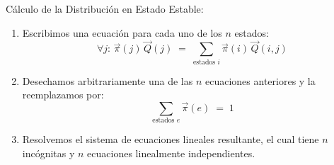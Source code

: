 \documentclass[ 10pt, xcolor = dvipsnames]{beamer}
\begin{document}
\begin{frame}[allowframebreaks]
\frametitle{\insertsubsection}

C\'alculo de la Distribuci\'on en Estado Estable: 
\begin{enumerate}
\item Escribimos una ecuaci\'on para cada uno de los $n$ estados: 
\[
\forall j \colon \, \vec{\pi}(j) \, \vec{Q}(j) \; = \; 
\sum_{\text{estados }i} \vec{\pi}(i) \, \vec{Q}(i,j) 
\]
\item Desechamos arbitrariamente una de las $n$ ecuaciones anteriores y la reemplazamos por: 
\[
\sum_{\text{estados }e} \vec{\pi}(e) \; = \; 1
\]
\item Resolvemos el sistema de ecuaciones lineales resultante, el cual tiene \linebreak $n$ inc\'ognitas y $n$ ecuaciones linealmente independientes. 

\end{enumerate}

\end{frame}
\end{document}
